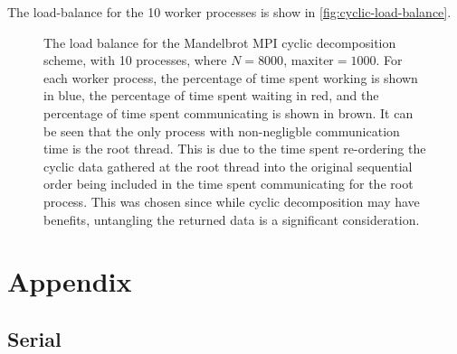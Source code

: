 \documentclass{article}
\begin{document}
The load-balance for the 10 worker processes is show in
\autoref{fig:cyclic-load-balance}.
\begin{figure}[h]
  \centering
  \caption{The load balance for the Mandelbrot MPI cyclic decomposition scheme,
    with 10 processes, where $N = 8000$, $\mathrm{maxiter} = 1000$. For each
    worker process, the percentage of time spent working is shown in blue, the
    percentage of time spent waiting in red, and the percentage of time spent
    communicating is shown in brown. It can be seen that the only process with
    non-negligble communication time is the root thread. This is due to the time
    spent re-ordering the cyclic data gathered at the root thread into the
    original sequential order being included in the time spent communicating for
    the root process. This was chosen since while cyclic decomposition may have
    benefits, untangling the returned data is a significant consideration.}
  \label{fig:cyclic-load-balance}
\end{figure}


\clearpage
\appendix
\section{Appendix}
\label{sec:appendix}

\subsection{Serial}
\label{sec:serial-code}
\end{document}
